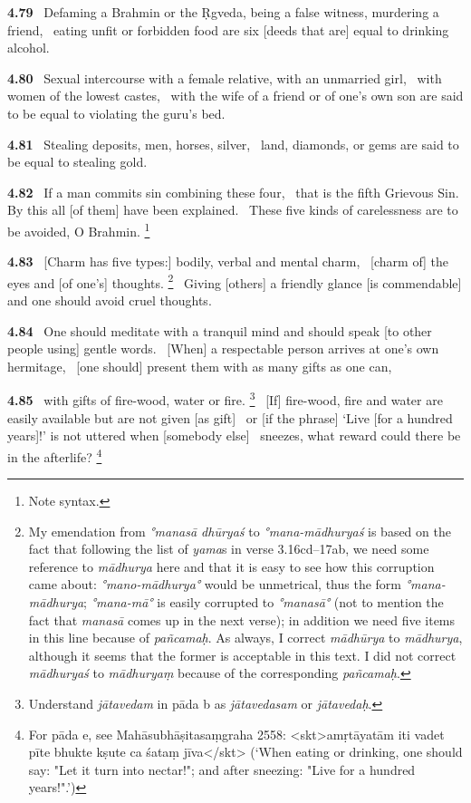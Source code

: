 \documentclass{article}
\newcommand{\skt}[1]{\textit{#1}}
\begin{document}
\textbf{4.79}%
\ Defaming a Brahmin or the Ṛgveda, being a false witness, murdering a friend,%
\ eating unfit or forbidden food are six [deeds that are] equal to drinking alcohol.%


\textbf{4.80}%
\ Sexual intercourse with a female relative, with an unmarried girl,%
\                  with women of the lowest castes,%
\ with the wife of a friend or of one's own son are said to be equal to violating the guru's bed.%


\textbf{4.81}%
\ Stealing deposits, men, horses, silver,%
\ land, diamonds, or gems are said to be equal to stealing gold.%


\textbf{4.82}%
\ If a man commits sin combining these four,%
\ that is the fifth Grievous Sin. By this all [of them] have been explained.%
\ These five kinds of carelessness are to be avoided, O Brahmin.%
\footnote{Note syntax. }%


\textbf{4.83}%
\ [Charm has five types:] bodily, verbal and mental charm,%
\                         [charm of] the eyes and [of one's] thoughts.%
\footnote{My emendation from \skt{°manasā dhūryaś} to \skt{°mana-mādhuryaś} is based on the fact that following the list                of \skt{yama}s in verse 3.16cd--17ab, we need some reference to \skt{mādhurya} here and that it is easy to see how this                 corruption came about: \skt{°mano-mādhurya°} would be unmetrical, thus the form \skt{°mana-mādhurya};                        \skt{°mana-mā°} is easily corrupted to \skt{°manasā°} (not to mention the fact                         that \skt{manasā} comes up in the next verse);                         in addition we need five items in this line because of \skt{pañcamaḥ}.                        As always, I correct \skt{mādhūrya} to \skt{mādhurya}, although it seems that                         the former is acceptable in this text.                         I did not correct \skt{mādhuryaś} to \skt{mādhuryaṃ} because of the corresponding                        \skt{pañcamaḥ}. }%
\ Giving [others] a friendly glance [is commendable] and one should avoid cruel thoughts.%


\textbf{4.84}%
\ One should meditate with a tranquil mind and should speak [to other people using] gentle words.%
\ [When] a respectable person arrives at one's own hermitage,%
\                        [one should] present them with as many gifts as one can,%


\textbf{4.85}%
\ with gifts of fire-wood, water or fire.%
\footnote{Understand \skt{jātavedam} in pāda b as \skt{jātavedasam} or \skt{jātavedaḥ}. }%
\ [If] fire-wood, fire and water are easily available but are not given [as gift]%
\ or [if the phrase] `Live [for a hundred years]!' is not uttered when [somebody else]%
\                 sneezes, what reward could there be in the afterlife?%
\footnote{For pāda e, see Mahāsubhāṣitasaṃgraha 2558:                 <skt>amṛtāyatām iti vadet pīte bhukte kṣute ca śataṃ jīva</skt>                (`When eating or drinking, one should say: "Let it turn into nectar!";                  and after sneezing: "Live for a hundred years!".')  }%
\end{document}
